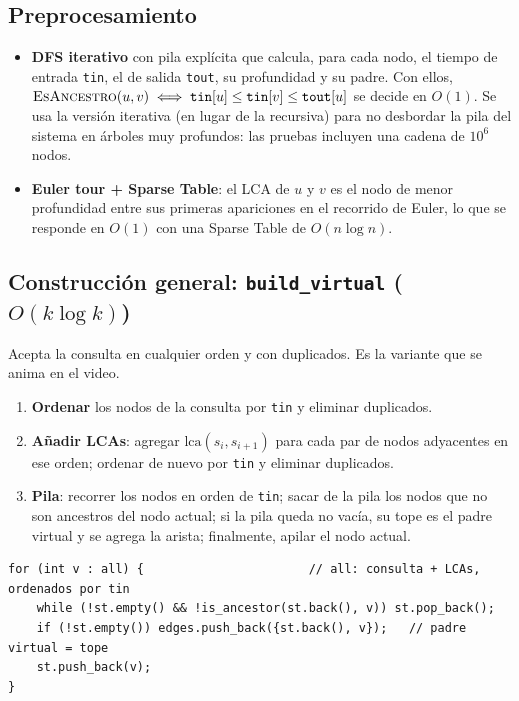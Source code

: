 \documentclass[11pt,a4paper]{article}
\theoremstyle{plain}
\begin{document}
\subsection{Preprocesamiento}
\begin{itemize}
  \item \textbf{DFS iterativo} con pila explícita que calcula, para cada nodo, el tiempo de
        entrada \texttt{tin}, el de salida \texttt{tout}, su profundidad y su padre. Con ellos,
        $\textsc{EsAncestro}(u,v) \iff \mathtt{tin}[u] \le \mathtt{tin}[v] \le \mathtt{tout}[u]$
        se decide en $O(1)$. Se usa la versión iterativa (en lugar de la recursiva) para no
        desbordar la pila del sistema en árboles muy profundos: las pruebas incluyen una cadena
        de $10^6$ nodos.
  \item \textbf{Euler tour + Sparse Table}: el LCA de $u$ y $v$ es el nodo de menor
        profundidad entre sus primeras apariciones en el recorrido de Euler, lo que se
        responde en $O(1)$ con una Sparse Table de $O(n \log n)$.
\end{itemize}

\subsection{\texorpdfstring{Construcción general: \texttt{build\_virtual} ($O(k \log k)$)}{Construcción general: build\_virtual, O(k log k)}}
Acepta la consulta en cualquier orden y con duplicados. Es la variante que se anima en el video.
\begin{enumerate}[label=\textbf{\arabic*.}]
  \item \textbf{Ordenar} los nodos de la consulta por \texttt{tin} y eliminar duplicados.
  \item \textbf{Añadir LCAs}: agregar $\mathrm{lca}(s_i, s_{i+1})$ para cada par de nodos
        adyacentes en ese orden; ordenar de nuevo por \texttt{tin} y eliminar duplicados.
  \item \textbf{Pila}: recorrer los nodos en orden de \texttt{tin}; sacar de la pila los
        nodos que no son ancestros del nodo actual; si la pila queda no vacía, su tope es el
        padre virtual y se agrega la arista; finalmente, apilar el nodo actual.
\end{enumerate}

\begin{lstlisting}
for (int v : all) {                       // all: consulta + LCAs, ordenados por tin
    while (!st.empty() && !is_ancestor(st.back(), v)) st.pop_back();
    if (!st.empty()) edges.push_back({st.back(), v});   // padre virtual = tope
    st.push_back(v);
}
\end{lstlisting}
\end{document}
